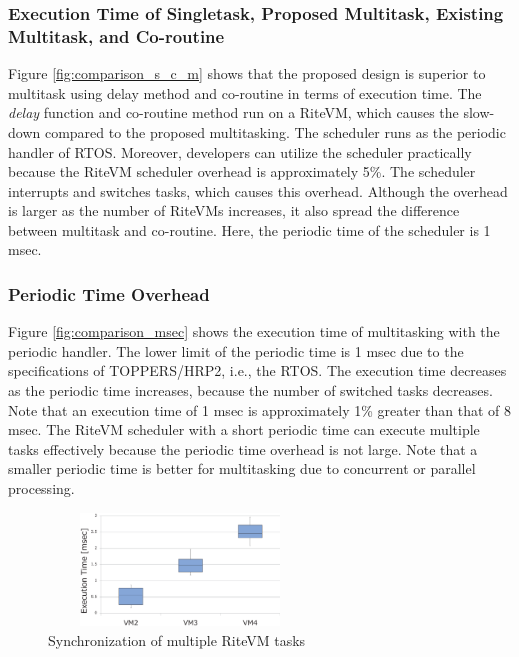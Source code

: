 \documentclass[conference]{IEEEtran/IEEEtran/IEEEtran}
\begin{document}
\subsubsection{Execution Time of Singletask, Proposed Multitask, Existing Multitask, and Co-routine}
Figure \ref{fig:comparison_s_c_m} shows that the proposed design is superior to multitask using delay method and co-routine in terms of execution time.
The {\it delay} function and co-routine method run on a RiteVM, which causes the slow-down compared to the proposed multitasking.
The scheduler runs as the periodic handler of RTOS.
Moreover, developers can utilize the scheduler practically because the RiteVM scheduler overhead is approximately 5\%.
The scheduler interrupts and switches tasks, which causes this overhead.
Although the overhead is larger as the number of RiteVMs increases, it also spread the difference between multitask and co-routine.
Here, the periodic time of the scheduler is 1 msec.

\subsubsection{Periodic Time Overhead}
Figure \ref{fig:comparison_msec} shows the execution time of multitasking with the periodic handler.
The lower limit of the periodic time is 1 msec due to the specifications of TOPPERS/HRP2, i.e., the RTOS.
The execution time decreases as the periodic time increases, because the number of switched tasks decreases.
Note that an execution time of 1 msec is approximately 1\% greater than that of 8 msec.
The RiteVM scheduler with a short periodic time can execute multiple tasks effectively because the periodic time overhead is not large.
Note that a smaller periodic time is better for multitasking due to concurrent or parallel processing.

 \begin{figure}[t]
    \centering
    \includegraphics[height=3.0cm,width=7.0cm,clip]{figure/eval_synchronization.eps}
    \vspace{-3mm}
\caption{Synchronization of multiple RiteVM tasks}
    \vspace{-3mm}
\label{fig:eval_synchronization}
\end{figure}
\end{document}
